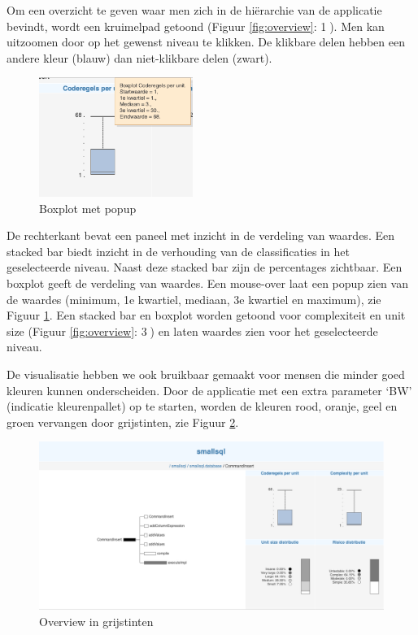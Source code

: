 \documentclass[a4paper]{article}
\begin{document}
Om een overzicht te geven waar men zich in de hiërarchie van de applicatie bevindt, wordt een kruimelpad getoond (Figuur \ref{fig:overview}: \textcircled{1}). Men kan uitzoomen door op het gewenst niveau te klikken. De klikbare delen hebben een andere kleur (blauw) dan niet-klikbare delen (zwart).
\begin{figure}[h]
\centering
  \includegraphics[width=5cm]{images/boxplot_popup.png}
  \caption{Boxplot met popup}
  \label{fig:boxplot_popup}
\end{figure}


De rechterkant bevat een paneel met inzicht in de verdeling van waardes. Een stacked bar biedt inzicht in de verhouding van de classificaties in het geselecteerde niveau. Naast deze stacked bar zijn de percentages zichtbaar. Een boxplot geeft de verdeling van waardes. Een mouse-over laat een popup zien van de waardes (minimum, 1e kwartiel, mediaan, 3e kwartiel en maximum), zie Figuur \ref{fig:boxplot_popup}.
Een stacked bar en boxplot worden getoond voor complexiteit en unit size (Figuur \ref{fig:overview}: \textcircled{3}) en laten waardes zien voor het geselecteerde niveau.

De visualisatie hebben we ook bruikbaar gemaakt voor mensen die minder goed kleuren kunnen onderscheiden. Door de applicatie met een extra parameter ‘BW’ (indicatie kleurenpallet) op te starten, worden de kleuren rood, oranje, geel en groen vervangen door grijstinten, zie Figuur \ref{fig:overview_blackwhite}.
\begin{figure}[h]
\centering
  \includegraphics[width=\linewidth]{images/overview_blackwhite.png}
  \caption{Overview in grijstinten}
  \label{fig:overview_blackwhite}
\end{figure}
\end{document}
